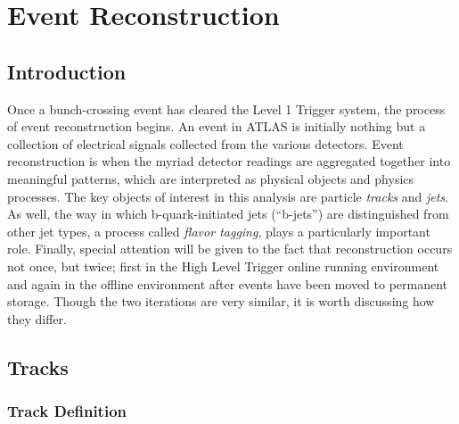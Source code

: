 \chapter{Event Reconstruction} \label{chapter:reconstruction}

    \section{Introduction}

        Once a bunch-crossing event has cleared the Level 1 Trigger system, the process of event reconstruction begins.
        An event in ATLAS is initially nothing but a collection of electrical signals collected from the various detectors.
        Event reconstruction is when the myriad detector readings are aggregated together into meaningful patterns,
            which are interpreted as physical objects and physics processes.
        The key objects of interest in this analysis are particle \textit{tracks} and \textit{jets}.
        As well, the way in which b-quark-initiated jets (``b-jets'') are distinguished from other jet types,
            a process called \textit{flavor tagging}, plays a particularly important role.
        Finally, special attention will be given to the fact that reconstruction occurs not once, but twice;
            first in the High Level Trigger online running environment
            and again in the offline environment after events have been moved to permanent storage.
        Though the two iterations are very similar, it is worth discussing how they differ.

    \FloatBarrier
    \section{Tracks} \label{sec:reco_tracks}
            
        \subsection{Track Definition}
            
